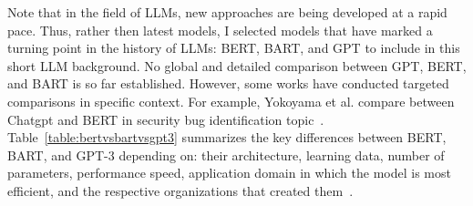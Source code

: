 Note that in the field of LLMs, new approaches are being developed at a rapid pace. Thus, rather then latest models, I selected models that have marked a turning point in the history of LLMs: BERT, BART, and GPT to include in this short LLM background. No global and detailed comparison between GPT, BERT, and BART is so far established. However, some works have conducted targeted comparisons in specific context. For example, Yokoyama et al. compare between Chatgpt and BERT in security bug identification topic~\cite{10685583}. Table~\ref{table:bertvsbartvsgpt3} summarizes the key differences between BERT, BART, and GPT-3 depending on: their architecture, learning data, number of parameters, performance speed, application domain in which the model is most efficient, and the respective organizations that created them~\cite{DBLP:journals/corr/abs-2302-09419,lewis2019bartdenoisingsequencetosequencepretraining}.
